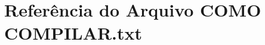 \hypertarget{COMO_01COMPILAR_8txt}{}\section{Referência do Arquivo C\+O\+MO C\+O\+M\+P\+I\+L\+A\+R.\+txt}
\label{COMO_01COMPILAR_8txt}
